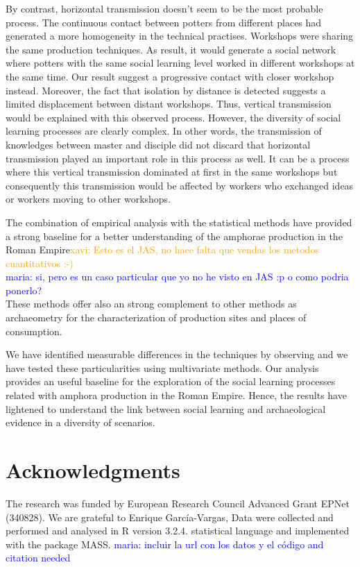 \documentclass[review]{elsarticle}
\newcommand{\memo}[2]{\textcolor{#1}{#2}}
\newcommand{\xavi}[1]{\memo{orange}{xavi: #1\\}}
\newcommand{\maria}[1]{\memo{blue}{maria: #1\\}}
\begin{document}
By contrast, horizontal transmission doesn't seem to be the most probable process. The continuous contact between potters from different places had generated a more homogeneity in the technical practises. Workshops were sharing the same production techniques. As result, it would generate a social network where potters with the same social learning level worked in different workshops at the same time. Our result suggest a progressive contact with closer workshop instead. Moreover, the fact that isolation by distance is detected suggests a limited displacement between distant workshops. Thus, vertical transmission would be explained with this observed process. However, the diversity of social learning processes are clearly complex. In other words, the transmission of knowledges between master and disciple did not discard that horizontal transmission played an important role in this process as well. It can be a process where this vertical transmission dominated at first in the same workshops but consequently this transmission would be affected by workers who exchanged ideas or workers moving to other workshops.  

The combination of empirical analysis with the statistical methods have provided a strong baseline for a better understanding of the amphorae production in the Roman Empire\xavi{Esto es el JAS, no hace falta que vendas los metodos cuantitativos :-)}
\maria{si, pero es un caso particular que yo no he visto en JAS :p o como podria ponerlo?} These methods offer also an strong complement to other methods as archaeometry for the characterization of production sites and places of consumption.  

We have identified measurable differences in the techniques by observing and we have tested these particularities using multivariate methods. Our analysis provides an useful baseline for the exploration of the social learning processes related with amphora production in the Roman Empire. Hence, the results have lightened to understand the link between social learning and archaeological evidence in a diversity of scenarios. 

\section{Acknowledgments}

The research was funded by European Research Council Advanced Grant EPNet (340828).
We are grateful to Enrique García-Vargas, Data were collected and performed and analysed in R version 3.2.4. statistical language and implemented with the package MASS.
\maria{incluir la url con los datos y el código and citation needed}
\end{document}

